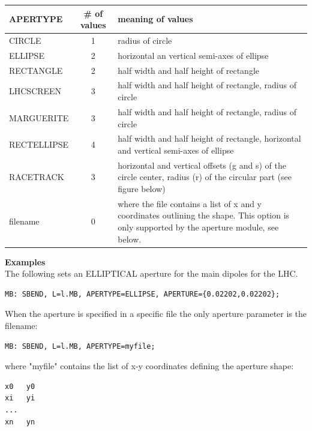 \begin{tabular}{|l | c | p{9cm}|}
\hline 
\textbf{APERTYPE} & \textbf{\# of values} & \textbf{meaning of
  values} \\  
\hline
CIRCLE & 1 &  radius of circle \\ 
\hline
ELLIPSE & 2 & horizontal an vertical semi-axes of ellipse \\  
\hline
RECTANGLE & 2 & half width and half height of rectangle\\ 
\hline
LHCSCREEN & 3 & half width and half height of rectangle, radius of circle\\  
\hline
MARGUERITE & 3 & half width and half height of rectangle, radius of circle\\  
\hline
RECTELLIPSE & 4 & half width and half height of rectangle, horizontal
and vertical semi-axes of ellipse \\  
\hline
RACETRACK & 3 & horizontal and vertical offsets (g and s) of the circle center,
radius (r) of the circular part (see figure below)\\  
\hline
filename & 0 & where the file contains a list of x and y coordinates
outlining the shape. This option is only supported by the aperture
module, see below. \\  
\hline
\end{tabular}

{\bf Examples}\\
The following sets an ELLIPTICAL aperture for the main
dipoles for the LHC.
\begin{verbatim}
MB: SBEND, L=l.MB, APERTYPE=ELLIPSE, APERTURE={0.02202,0.02202};
\end{verbatim} 

When the aperture is specified in a specific file the only aperture
parameter is the filename: 
\begin{verbatim}
MB: SBEND, L=l.MB, APERTYPE=myfile;
\end{verbatim} 

where "myfile" contains the list of x-y coordinates defining the
aperture shape:
\begin{verbatim}
x0   y0
xi   yi
...
xn   yn
\end{verbatim}

